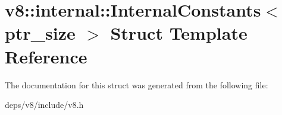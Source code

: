 \hypertarget{structv8_1_1internal_1_1_internal_constants}{}\section{v8\+:\+:internal\+:\+:Internal\+Constants$<$ ptr\+\_\+size $>$ Struct Template Reference}
\label{structv8_1_1internal_1_1_internal_constants}


The documentation for this struct was generated from the following file\+:\begin{DoxyCompactItemize}
\item 
deps/v8/include/v8.\+h\end{DoxyCompactItemize}
